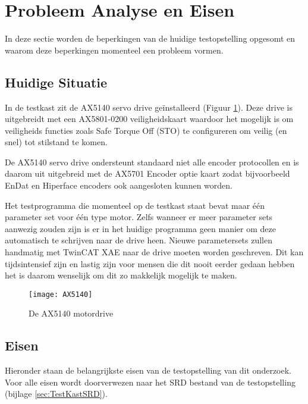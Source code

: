 \section{Probleem Analyse en Eisen} \label{sec:ProbleemAnalyseEnEisen}

In deze sectie worden de beperkingen van de huidige testopstelling opgesomt en waarom deze beperkingen momenteel een probleem vormen.

\subsection{Huidige Situatie}

In de testkast zit de \gls{AX5140} servo drive geïnstalleerd (Figuur \ref{fig:AX5140}). Deze drive is uitgebreidt met een \gls{AX5801}-0200 veiligheidskaart waardoor het mogelijk is om veiligheids functies zoals Safe Torque Off (\gls{STO}) te configureren om veilig (en snel) tot stilstand te komen.

\vspace{0.5cm}

De \gls{AX5140} servo drive ondersteunt standaard niet alle encoder protocollen en is daarom uit uitgebreid met de \gls{AX5701} Encoder optie kaart zodat bijvoorbeeld EnDat en Hiperface encoders ook aangesloten kunnen worden.

\vspace{0.5cm}

Het testprogramma die momenteel op de testkast staat bevat maar één parameter set voor één type motor. Zelfs wanneer er meer parameter sets aanwezig zouden zijn is er in het huidige programma geen manier om deze automatisch te schrijven naar de drive heen. Nieuwe parametersets zullen handmatig met TwinCAT XAE naar de drive moeten worden geschreven. Dit kan tijdsintensief zijn en lastig zijn voor mensen die dit nooit eerder gedaan hebben het is daarom wenselijk om dit zo makkelijk mogelijk te maken.

\begin{figure}[h]
	\centering
	\texttt{[image: AX5140]}
	\label{fig:AX5140}
	\caption{De \gls{AX5140} motordrive \cite{web:AX5140Drive}}
\end{figure}

\newpage

\subsection{Eisen}

Hieronder staan de belangrijkste eisen van de testopstelling van dit onderzoek. Voor alle eisen wordt doorverwezen naar het SRD bestand van de testopstelling (bijlage \ref{sec:TestKastSRD}).

